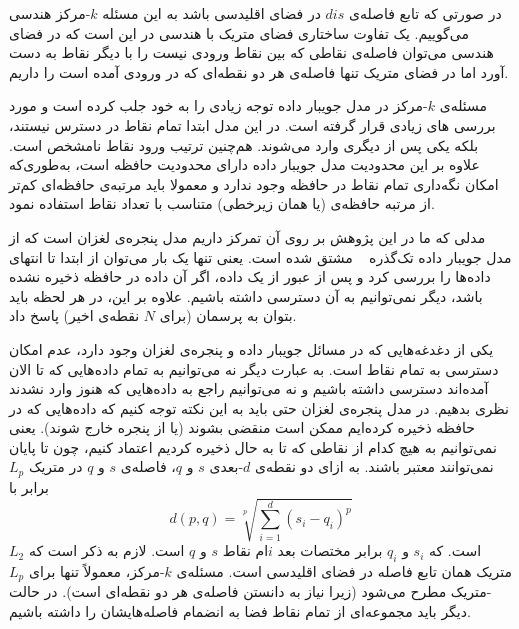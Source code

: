 در صورتی که تابع فاصله‌ی $dis$ در فضای اقلیدسی باشد به این مسئله $k$-مرکز هندسی می‌گوییم. یک تفاوت ساختاری فضای متریک با هندسی در این است که در فضای هندسی می‌توان فاصله‌ی نقاطی که بین نقاط ورودی نیست را با دیگر نقاط به دست آورد اما در فضای متریک تنها فاصله‌ی هر دو نقطه‌ای که در ورودی آمده است را داریم.

مسئله‌ی $k$-مرکز در مدل جویبار داده توجه زیادی را به خود جلب کرده است و مورد بررسی ‌های زیادی قرار گرفته است. در این مدل ابتدا تمام نقاط در دسترس نیستند، بلکه یکی پس از دیگری وارد می‌شوند. هم‌چنین ترتیب ورود نقاط نامشخص است. 
علاوه بر این محدودیت مدل جویبار داده دارای محدودیت حافظه است، به‌طوری‌که امکان نگه‌داری تمام نقاط در حافظه  وجود ندارد و معمولا باید مرتبه‌ی حافظه‌ای کم‌تر از مرتبه حافظه‌ی  (یا همان زیرخطی) متناسب با تعداد نقاط استفاده نمود.

مدلی که ما در این پژوهش بر روی آن تمرکز داریم مدل پنجره‌ی لغزان است که از مدل جویبار داده تک‌گذره ~ مشتق شده‌ است.
یعنی تنها یک بار می‌توان از ابتدا تا انتهای داده‌ها را بررسی کرد و پس از عبور از یک داده، اگر آن داده در حافظه ذخیره نشده باشد، دیگر نمی‌توانیم به آن دسترسی داشته باشیم. علاوه بر این، در هر لحظه باید بتوان به پرسمان (برای $N$ نقطه‌ی اخیر) پاسخ داد.

یکی از دغدغه‌هایی که در مسائل جویبار داده  و پنجره‌ی لغزان وجود دارد، عدم امکان دسترسی به تمام نقاط است.
به عبارت دیگر نه می‌توانیم به تمام داده‌هایی که تا الان آمده‌اند دسترسی داشته باشیم و نه می‌توانیم راجع به داده‌هایی که هنوز وارد نشدند نظری بدهیم. در مدل پنجره‌ی لغزان حتی باید به این نکته توجه کنیم که داده‌هایی که در حافظه ذخیره کرده‌ایم ممکن است منقضی بشوند (یا از پنجره‌ خارج شوند). یعنی نمی‌توانیم به هیچ کدام از نقاطی که تا به حال ذخیره کردیم اعتماد کنیم، چون تا پایان نمی‌توانند معتبر باشند.
به ازای دو نقطه‌ی $d$-بعدی $s$ و $q$، فاصله‌ی $s$ و $q$ در متریک $L_p$ برابر با
$$d(p, q) = \sqrt[p]{\sum_{i=1}^{d} (s_i - q_i) ^ p}$$
است. که $s_i$ و $q_i$ برابر مختصات بعد $i$ام نقاط $s$ و $q$ است. 
لازم به ذکر است که $L_2$ متریک همان تابع فاصله در فضای اقلیدسی است. مسئله‌ی $k$-مرکز، معمولاً تنها برای $L_p$-متریک مطرح می‌شود (زیرا نیاز به دانستن فاصله‌ی هر دو نقطه‌ای است). در حالت دیگر باید مجموعه‌ای از تمام نقاط فضا به انضمام فاصله‌هایشان را داشته باشیم.
%
%

